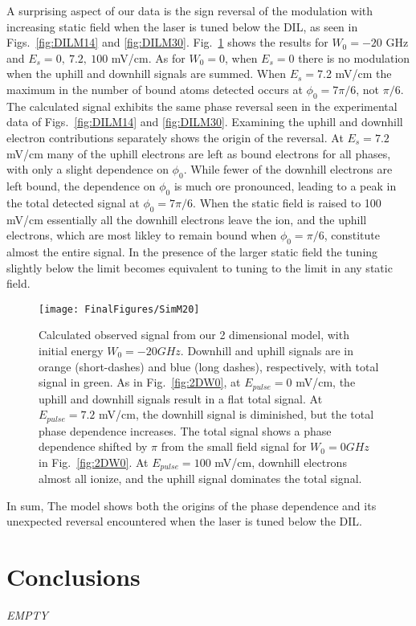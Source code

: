 \documentclass[aps,pra,preprint,groupedaddress]{revtex4-1}
\begin{document}
A surprising aspect of our data is the sign reversal of the modulation with increasing static field when the laser is tuned below the DIL, as seen in Figs.~\ref{fig:DILM14} and \ref{fig:DILM30}. Fig.~\ref{fig:2DW20} shows the results for $W_0 = -20$ GHz and $E_s = 0, ~7.2, ~100$ mV/cm. As for $W_0=0$, when $E_s=0$ there is no modulation when the uphill and downhill signals are summed. When $E_s=$7.2 mV/cm the maximum in the number of bound atoms detected occurs at $\phi_0=7\pi/6$, not $\pi/6$. The calculated signal exhibits the same phase reversal seen in the experimental data of Figs.~\ref{fig:DILM14} and \ref{fig:DILM30}. Examining the uphill and downhill electron contributions separately shows the origin of the reversal. At $E_s = 7.2$ mV/cm many of the uphill electrons are left as bound electrons for all phases, with only a slight dependence on $\phi_0$. While fewer of the downhill electrons are left bound, the dependence on $\phi_0$ is much ore pronounced, leading to a peak in the total detected signal at $\phi_0=7\pi/6$. When the static field is raised to 100 mV/cm essentially all the downhill electrons leave the ion, and the uphill electrons, which are most likley to remain bound when $\phi_0=\pi/6$, constitute almost the entire signal. In the presence of the larger static field the tuning slightly below the limit becomes equivalent to tuning to the limit in any static field.

\begin{figure}
	\texttt{[image: FinalFigures/SimM20]}
	\caption{Calculated observed signal from our 2 dimensional model, with initial energy $W_0 = -20 GHz$. Downhill and uphill signals are in orange (short-dashes) and blue (long dashes), respectively, with total signal in green. As in Fig.~\ref{fig:2DW0}, at $E_{pulse} = 0$ mV/cm, the uphill and downhill signals result in a flat total signal. At $E_{pulse} = 7.2$ mV/cm, the downhill signal is diminished, but the total phase dependence increases. The total signal shows a phase dependence shifted by $\pi$ from the small field signal for $W_0 = 0 GHz$ in Fig.~\ref{fig:2DW0}. At $E_{pulse} = 100$ mV/cm, downhill electrons almost all ionize, and the uphill signal dominates the total signal.}
	\label{fig:2DW20}
\end{figure}

In sum, The model shows both the origins of the phase dependence and its unexpected reversal encountered when the laser is tuned below the DIL.

\section{\label{sec:conc} Conclusions}

\emph{EMPTY}

%
\end{document}

